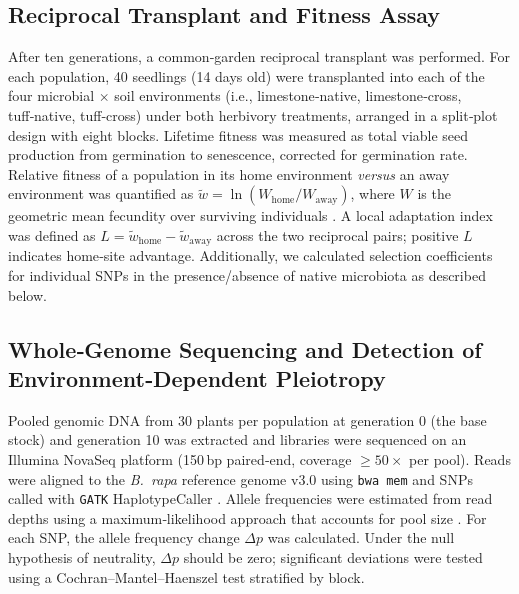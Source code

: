 \documentclass{article}
\begin{document}
\subsection{Reciprocal Transplant and Fitness Assay}

After ten generations, a common‑garden reciprocal transplant was performed. For each population, 40 seedlings (14 days old) were transplanted into each of the four microbial $\times$ soil environments (i.e., limestone‑native, limestone‑cross, tuff‑native, tuff‑cross) under both herbivory treatments, arranged in a split‑plot design with eight blocks. Lifetime fitness was measured as total viable seed production from germination to senescence, corrected for germination rate. Relative fitness of a population in its home environment \textit{versus} an away environment was quantified as $\tilde{w} = \ln(W_{\text{home}} / W_{\text{away}})$, where $W$ is the geometric mean fecundity over surviving individuals \cite{kawecki2004}. A local adaptation index was defined as $L = \tilde{w}_{\text{home}}-\tilde{w}_{\text{away}}$ across the two reciprocal pairs; positive $L$ indicates home‑site advantage. Additionally, we calculated selection coefficients for individual SNPs in the presence/absence of native microbiota as described below.

\subsection{Whole‑Genome Sequencing and Detection of Environment‑Dependent Pleiotropy}

Pooled genomic DNA from 30 plants per population at generation 0 (the base stock) and generation 10 was extracted and libraries were sequenced on an Illumina NovaSeq platform (150\,bp paired‑end, coverage $\geq 50\times$ per pool). Reads were aligned to the \emph{B.~rapa} reference genome v3.0 \cite{zhang2018} using \texttt{bwa mem} and SNPs called with \texttt{GATK} HaplotypeCaller \cite{mckenna2010}. Allele frequencies were estimated from read depths using a maximum‑likelihood approach that accounts for pool size \cite{kessner2013}. For each SNP, the allele frequency change $\Delta p$ was calculated. Under the null hypothesis of neutrality, $\Delta p$ should be zero; significant deviations were tested using a Cochran–Mantel–Haenszel test stratified by block.
\end{document}

